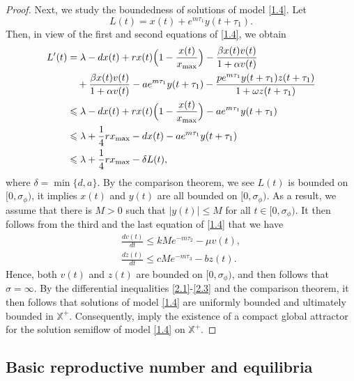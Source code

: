 \documentclass[reqno]{amsart}
\begin{document}
\begin{proof}
Next, we study the boundedness of solutions of model \eqref{1.4}. Let
 $$
 L(t)=x(t)+e^{m\tau_1}y(t+\tau_1).
 $$
Then,  in view of the first and second equations of \eqref{1.4}, we obtain
\begin{equation} \label{2.1}
 \begin{aligned}
 L'(t)&=\lambda-dx(t)+rx(t)\Big(1-\frac{x(t)}{x_{\rm max}}\Big)
  -\frac{\beta x(t)v(t)}{1+\alpha v(t)}   \\
 &\quad +\frac{\beta x(t)v(t)}{1+\alpha v(t)}-ae^{m\tau_1}y(t+\tau_1)-\frac{pe^{m\tau_1}y(t+\tau_1)z(t+\tau_1)}{1+\omega z(t+\tau_1)}  \\
 &\leqslant\lambda-dx(t)+rx(t)\Big(1-\frac{x(t)}{x_{\rm max}}\Big)-ae^{m\tau_1}y(t+\tau_1)   \\
 &\leqslant\lambda+\frac{1}{4}rx_{\rm max}-dx(t)-ae^{m\tau_1}y(t+\tau_1)   \\
 &\leqslant \lambda+\frac{1}{4}rx_{\rm max}-\delta L(t),
 \end{aligned}
\end{equation}
where $\delta=\min\{d,a\}$. By the comparison theorem,  we see $L(t)$ is bounded
on $[0, \sigma_{\phi})$, it implies $x(t)$ and $y(t)$ are all bounded on
$[0, \sigma_{\phi})$.  As a result, we assume that there is $M>0$ such that
$|y(t)|\leq M$ for all $t\in [0, \sigma_{\phi})$. It then follows from  the third and
the last equation of  \eqref{1.4} that we have
 \begin{gather}
 \frac{dv(t)}{dt}\leqslant k Me^{-m\tau_2}-\mu v(t),  \label{2.2} \\
 \frac{dz(t)}{dt}\leqslant cMe^{-m\tau_3}-bz(t).\label{2.3}
 \end{gather}
Hence, both $v(t)$ and $z(t)$ are bounded on $[0, \sigma_{\phi})$, and then
\cite[Theorem 2.3.1]{HV} follows that $\sigma=\infty$.
By the differential inequalities \eqref{2.1}-\eqref{2.3} and the comparison theorem,
it then follows that solutions of model \eqref{1.4} are uniformly bounded and
ultimately bounded in $\mathbb{X}^+$. Consequently,
\cite [Corollary 3.6.2 and Theorem 4.5.2]{HV}
imply the existence of a compact global attractor for the solution semiflow of model
\eqref{1.4} on $\mathbb{X}^+$.
\end{proof}


\subsection{Basic reproductive number and equilibria}
\end{document}

